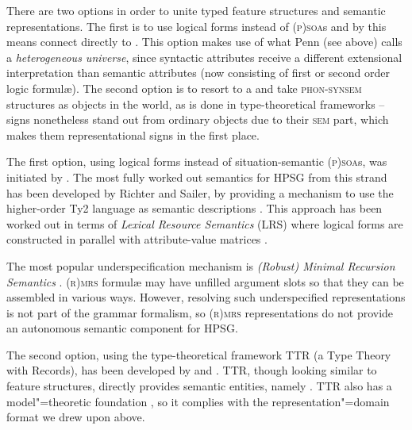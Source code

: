 \documentclass[output=paper]{langsci/langscibook}
\begin{document}
{There are two options in order to unite typed feature structures and semantic representations.
%
The first is to use logical forms  instead of \textsc{(p)soa}s and by this means connect directly to .
%
This option makes use of what Penn (see above) calls a \emph{heterogeneous universe},  since syntactic attributes receive a different extensional interpretation than  semantic attributes (now consisting of first or second order logic formul{\ae}).
%
The second option is to resort to a  and take \textsc{phon-synsem} structures as objects in the world, as is done in type-theoretical frameworks  -- signs nonetheless stand out from ordinary objects due to their \textsc{sem} part, which makes them representational signs in the first place.



The first option, using logical forms instead of situation-semantic \textsc{(p)soa}s, was initiated by \citet{Nerbonne:1992}. 
%
The most fully worked out semantics for HPSG from this strand has been developed by Richter and Sailer, by providing a mechanism to use the higher-order Ty2 language as semantic descriptions \citep{Richter:Sailer:1999:a}.
%
This approach has been worked out in terms of \emph{Lexical Resource Semantics} (LRS)  %
where logical forms are constructed in parallel with attribute-value matrices \citep{Richter:Sailer:04}.


The most popular underspecification mechanism is \emph{(Robust) Minimal Recursion Semantics}  \citep{Copestake:Flickinger:Pollard:Sag:2005,Copestake:2007}.
%
\textsc{(r)mrs} formul{\ae} may have unfilled argument slots so that they can be assembled in various ways.
%
However, resolving such underspecified representations is not part of the grammar formalism, so \textsc{(r)mrs} representations do not provide an autonomous semantic component for HPSG.



The second option, using the type-theoretical framework  TTR (a Type Theory with Records), has been developed by \citet{Cooper:2008,Cooper:2014:a,Cooper:ms} and \citet{Ginzburg:2012}.
%
TTR, though looking similar to feature structures, directly provides semantic entities, namely  \citep[Sec.~5.2.2]{Ginzburg:2012}.
%
TTR also has a model"=theoretic foundation \citep{Cooper:ms}, so it complies with the representation"=domain format we drew upon above.




}
\end{document}
